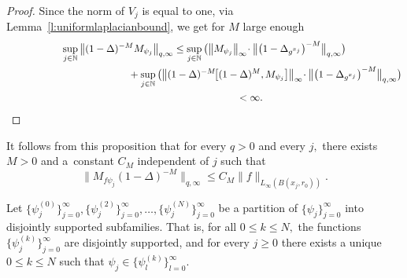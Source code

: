 \documentclass[pdftex]{sigma}
\numberwithin{equation}{section}
\begin{document}
\begin{proof}
Since the norm of $V_j$ is equal to one, via Lemma~\ref{l:uniformlaplacianbound}, we get for $M$ large enough
\begin{gather*}
 \sup_{j \in \mathbb{N}} \big\|(1-\Delta)^{-M}M_{\psi_j}\big\|_{q,\infty}\leq \sup_{j \in \mathbb{N}} \big( \big\| M_{\psi_j} \big\|_\infty \! \cdot \big\|\big(1-\Delta_{g^{x_j}}\big)^{-M}\big\|_{q,\infty} \big)\\
 \hphantom{\sup_{j \in \mathbb{N}} \big\|(1-\Delta)^{-M}M_{\psi_j}\big\|_{q,\infty}\leq}{}
 + \sup_{j \in \mathbb{N}} \big(\big\| (1-\Delta)^{-M}\!\big[(1-\Delta)^M, M_{\psi_j}\big] \big\|_\infty \! \cdot \big\|\big(1-\Delta_{g^{x_j}}\big)^{-M}\big\|_{q,\infty} \big) \\
 \hphantom{\sup_{j \in \mathbb{N}} \big\|(1-\Delta)^{-M}M_{\psi_j}\big\|_{q,\infty}}{}
 <\infty.
\tag*{\qed}
\end{gather*}
\renewcommand{\qed}{}
\end{proof}


It follows from this proposition that for every $q>0$ and every $j,$ there exists $M>0$ and a~constant $C_M$ independent of $j$ such that
\begin{equation}\label{weak_bounded_cwikel_estimate}
 \big\|M_{f\psi_j}(1-\Delta)^{-M}\big\|_{q,\infty} \leq C_M\|f\|_{L_{\infty}(B(x_j,r_0))}.
\end{equation}

Let $\big\{\psi_{j}^{(0)}\big\}_{j=0}^\infty, \big\{\psi_{j}^{(2)}\big\}_{j=0}^\infty , \ldots , \big\{\psi_{j}^{(N)}\big\}_{j=0}^\infty$ be a partition of $\{\psi_{j}\}_{j=0}^\infty$ into disjointly supported subfamilies. That is, for all $0\leq k\leq N,$ the functions $\big\{\psi_{j}^{(k)}\big\}_{j=0}^\infty$ are disjointly supported, and for every $j\geq 0$ there exists
a unique $0\leq k\leq N$ such that $\psi_{j} \in \big\{\psi_l^{(k)}\big\}_{l=0}^\infty.$
\end{document}

